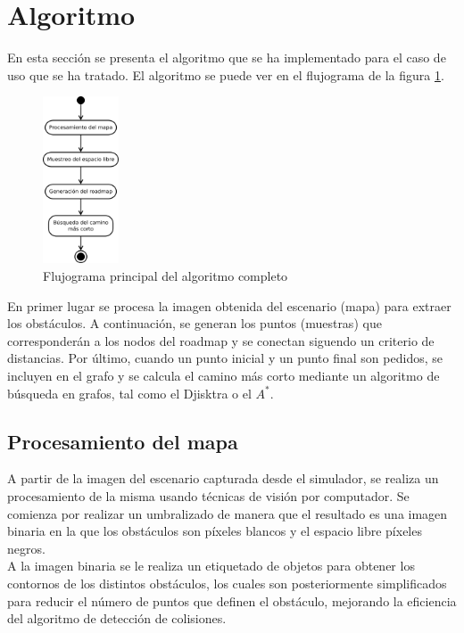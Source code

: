 \section{Algoritmo}
\label{algoritmo}

En esta sección se presenta el algoritmo que se ha implementado para el caso de uso que se ha tratado. El algoritmo se puede ver en el flujograma de la figura \ref{fig:flujo_algoritmo}. \\

\begin{figure}[h]
		\centering
        \includegraphics[width=0.2\textwidth]{images/flujo_main.png}
        \caption{Flujograma principal del algoritmo completo}
        \label{fig:flujo_algoritmo}
\end{figure} 


En primer lugar se procesa la imagen obtenida del escenario (mapa) para extraer los obstáculos. A continuación, se generan los puntos (muestras) que corresponderán a los nodos del roadmap y se conectan siguendo un criterio de distancias. Por último, cuando un punto inicial y un punto final son pedidos, se incluyen en el grafo y se calcula el camino más corto mediante un algoritmo de búsqueda en grafos, tal como el Djisktra o el $A^*$.\\

\subsection{Procesamiento del mapa}

A partir de la imagen del escenario capturada desde el simulador, se realiza un procesamiento de la misma usando técnicas de visión por computador. Se comienza por realizar un umbralizado de manera que el resultado es una imagen binaria en la que los obstáculos son píxeles blancos y el espacio libre píxeles negros. \\

A la imagen binaria se le realiza un etiquetado de objetos para obtener los contornos de los distintos obstáculos, los cuales son posteriormente simplificados para reducir el número de puntos que definen el obstáculo, mejorando la eficiencia del algoritmo de detección de colisiones.\\

